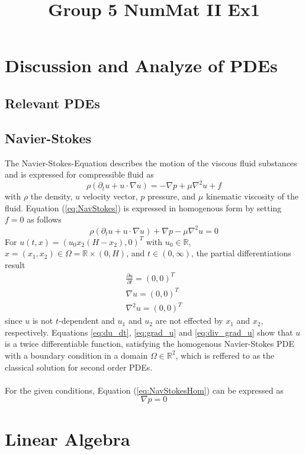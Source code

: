 \documentclass[a4paper]{article}
\title{Group 5 NumMat II Ex1}
\newcommand{\R}{\mathbb{R}}
\newcommand*{\EQ}[1]{Equation (\ref{eq:#1})}
\begin{document}
	\begin{titlepage}
		\maketitle
		\thispagestyle{empty}
	\end{titlepage}
	\newpage


\section{Discussion and Analyze of PDEs}

\subsection{Relevant PDEs}

\subsection{Navier-Stokes}
The Navier-Stokes-Equation describes the motion of the viscous fluid substances and is expressed for compressible fluid as
\begin{equation}
	\rho(\partial_t u + u \cdot \nabla u) = - \nabla p + \mu \nabla ^2 u + f
	\label{eq:NavStokes}
\end{equation}
with $\rho$ the density, $u$ velocity vector, $p$ pressure, and $\mu$ kinematic viscosity of the fluid.
\EQ{NavStokes} is expressed in homogenous form by setting $f = 0$ as follows
\begin{equation}
	\rho(\partial_t u + u \cdot \nabla u) + \nabla p - \mu \nabla ^2 u = 0
	\label{eq:NavStokesHom}
\end{equation}
For $u (t,x) = (u_0 x_2 (H - x_2), 0)^T$ with $u_0 \in \R$, $x = (x_ 1, x_2) \in \Omega = \R \times (0, H)$, and $t \in (0, \infty)$, the partial differentiations result
\begin{align}
	\frac{\partial u}{\partial t} = (0,0)^T \label{eq:du_dt}   \\
	\nabla u = (0,0)^T  					\label{eq:grad_u} \\
	\nabla^2 u = (0,0)^T  					\label{eq:div_grad_u}
\end{align}
since $u$ is not $t$-dependent and $u_1$ and $u_2$ are not effected by $x_1$ and $x_2$, respectively.
Equations \ref{eq:du_dt}, \ref{eq:grad_u} and \ref{eq:div_grad_u} show that $u$ is a twice differentiable function, satisfying the homogenous Navier-Stokes PDE with a boundary condition in a domain $\Omega \in \R^2$, which is reffered to as the classical solution for second order PDEs.
\\ \\
For the given conditions, \EQ{NavStokesHom} can be expressed as
\begin{equation}
	\nabla p = 0
\end{equation}
\section{Linear Algebra}
\end{document}
